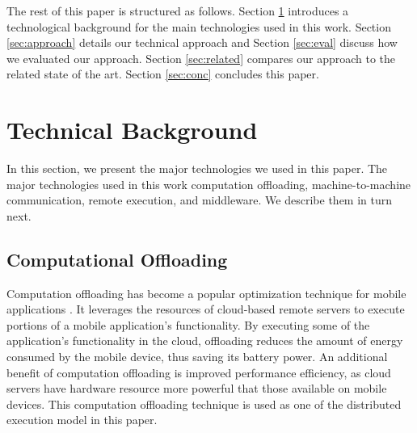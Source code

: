 \documentclass[conference]{IEEEtran}
\begin{document}


The rest of this paper is structured as follows. Section \ref{sec:background} introduces a technological background for the main technologies used in this work. Section \ref{sec:approach} details our technical approach and Section \ref{sec:eval} discuss how we evaluated our approach. Section \ref{sec:related} compares our approach to the related state of the art. Section \ref{sec:conc} concludes this paper.
 
\section{Technical Background}
\label{sec:background}
In this section, we present the major technologies we used in this paper. The major technologies used in this work computation offloading, machine-to-machine communication, remote execution, and middleware. We describe them in turn next.

\subsection{Computational Offloading}   
Computation offloading has become a popular optimization technique for mobile applications \cite{maui,chun+:eurosys11,kwon+:icdcs12,wen2012energy}. It leverages the resources of cloud-based remote servers to execute portions of a mobile application's functionality. By executing some of the application's functionality in the cloud, offloading reduces the amount of energy consumed by the mobile device, thus saving its battery power. An additional benefit of computation offloading is improved performance efficiency, as cloud servers have hardware resource more powerful that those available on mobile devices. This computation offloading technique is used as one of the distributed execution model in this paper.
\end{document}
